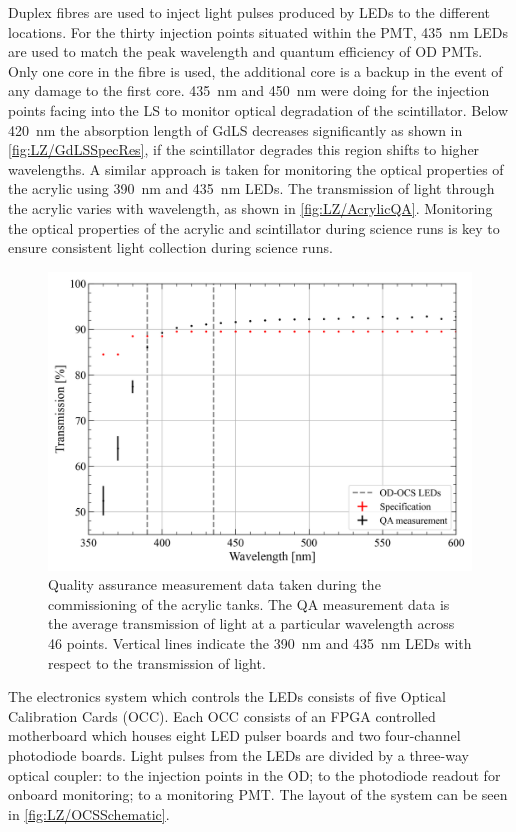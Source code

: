 Duplex fibres are used to inject light pulses produced by LEDs to the different locations. For the thirty injection points situated within the PMT, 435~nm LEDs are used to match the peak wavelength and quantum efficiency of OD PMTs. Only one core in the fibre is used, the additional core is a backup in the event of any damage to the first core. 435~nm and 450~nm were doing for the injection points facing into the LS to monitor optical degradation of the scintillator. Below 420~nm the absorption length of GdLS decreases significantly as shown in \autoref{fig:LZ/GdLSSpecRes}, if the scintillator degrades this region shifts to higher wavelengths. A similar approach is taken for monitoring the optical properties of the acrylic using 390~nm and 435~nm LEDs. The transmission of light through the acrylic varies with wavelength, as shown in \autoref{fig:LZ/AcrylicQA}. Monitoring the optical properties of the acrylic and scintillator during science runs is key to ensure consistent light collection during science runs.
\begin{figure}[!ht]
    \centering
    \includegraphics[width=0.8\linewidth]{figures/LZ/T187-XDM-UVT_WAVELENGHT_08252017.png}
    \caption{Quality assurance measurement data taken during the commissioning of the acrylic tanks. The QA measurement data is the average transmission of light at a particular wavelength across 46 points. Vertical lines indicate the 390~nm and 435~nm LEDs with respect to the transmission of light.}
    \label{fig:LZ/AcrylicQA}
\end{figure}
The electronics system which controls the LEDs consists of five Optical Calibration Cards (OCC). Each OCC consists of an FPGA controlled motherboard which houses eight LED pulser boards and two four-channel photodiode boards. Light pulses from the LEDs are divided by a three-way optical coupler: to the injection points in the OD; to the photodiode readout for onboard monitoring; to a monitoring PMT. The layout of the system can be seen in \autoref{fig:LZ/OCSSchematic}.
